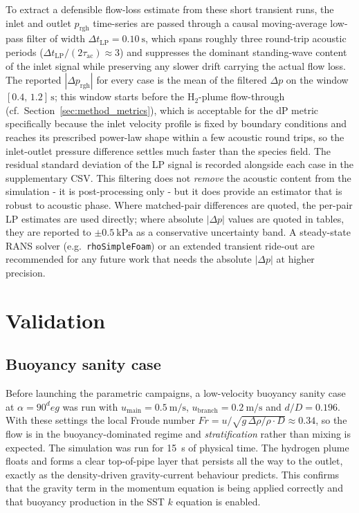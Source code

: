 \documentclass[11pt,a4paper]{article}
\def\dD{d/D}%
\def\Frnum{Fr}%
\def\circ{ deg}%
\newcommand{\dD}{\ensuremath{d/D}}
\newcommand{\Frnum}{\ensuremath{\mathrm{Fr}}}
\begin{document}
To extract a defensible flow-loss estimate from these short
transient runs, the inlet and outlet \(p_{\mathrm{rgh}}\)
time-series are passed through a causal moving-average low-pass
filter of width \(\Delta t_{\mathrm{LP}} = \SI{0.10}{\second}\),
which spans roughly three round-trip acoustic periods
(\(\Delta t_{\mathrm{LP}}/(2\tau_{\mathrm{ac}}) \approx 3\)) and
suppresses the dominant standing-wave content of the inlet
signal while preserving any slower drift carrying the actual
flow loss. The reported \(|\Delta p_{\mathrm{rgh}}|\) for every
case is the mean of the filtered \(\Delta p\) on the window
\([0.4,\,1.2]\,\si{\second}\); this window starts before the
H\(_2\)-plume flow-through (cf.\ Section~\ref{sec:method_metrics}),
which is acceptable for the dP metric specifically because the
inlet velocity profile is fixed by boundary conditions and
reaches its prescribed power-law shape within a few acoustic
round trips, so the inlet-outlet pressure difference settles
much faster than the species field. The residual standard
deviation of the LP signal is recorded alongside each case in
the supplementary CSV. This filtering does not \emph{remove} the
acoustic content from the simulation - it is post-processing
only - but it does provide an estimator that is robust to
acoustic phase. Where matched-pair differences are quoted, the
per-pair LP estimates are used directly; where absolute
\(|\Delta p|\) values are quoted in tables, they are reported to
\(\pm\SI{0.5}{\kilo\pascal}\) as a conservative uncertainty band.
A steady-state RANS solver (e.g.\ \texttt{rhoSimpleFoam}) or an
extended transient ride-out are recommended for any future work
that needs the absolute \(|\Delta p|\) at higher precision.

\section{Validation}
\label{sec:val}

\subsection{Buoyancy sanity case}
\label{sec:val_buoy}
Before launching the parametric campaigns, a low-velocity buoyancy
sanity case at \(\alpha=90^\circ\) was run with
\(u_{\mathrm{main}}=\SI{0.5}{\meter\per\second}\),
\(u_{\mathrm{branch}}=\SI{0.2}{\meter\per\second}\) and
\(\dD=0.196\). With these settings the local Froude number
\(\Frnum = u/\sqrt{g\,\Delta\rho/\rho\cdot D}\approx 0.34\), so the
flow is in the buoyancy-dominated regime and \emph{stratification}
rather than mixing is expected. The simulation was run for
\SI{15}{\second} of physical time. The hydrogen plume floats and
forms a clear top-of-pipe layer that persists all the way to the
outlet, exactly as the density-driven gravity-current behaviour
predicts. This confirms that the gravity
term in the momentum equation is being applied correctly and that
buoyancy production in the SST \(k\) equation is enabled.
\end{document}
